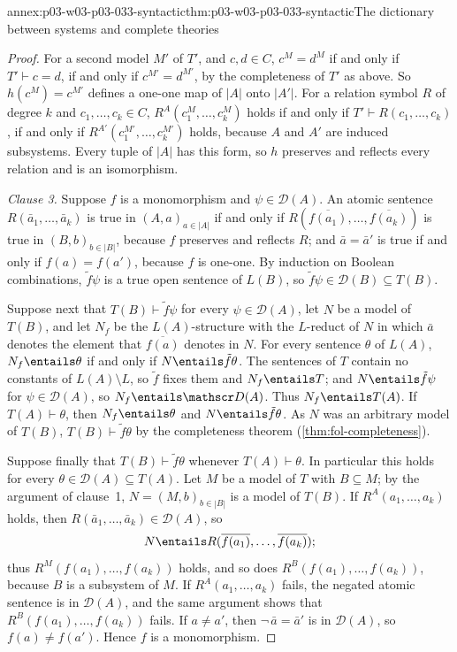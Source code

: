 \begin{annexitem}{annex:p03-w03-p03-033-syntactic}{thm:p03-w03-p03-033-syntactic}{The dictionary between systems and complete theories}
\begin{proof}
For a second model \(M'\) of \(T'\), and \(c,d\in C\),
\(c^M=d^M\) if and only if \(T'\vdash c=d\), if and only if
\(c^{M'}=d^{M'}\), by the completeness of \(T'\) as above. So
\(h(c^M)=c^{M'}\) defines a one-one map of \(|A|\) onto \(|A'|\). For a
relation symbol \(R\) of degree \(k\) and \(c_1,\dots,c_k\in C\),
\(R^A(c_1^M,\dots,c_k^M)\) holds if and only if
\(T'\vdash R(c_1,\dots,c_k)\), if and only if
\(R^{A'}(c_1^{M'},\dots,c_k^{M'})\) holds, because \(A\) and \(A'\) are
induced subsystems. Every tuple of \(|A|\) has this form, so \(h\)
preserves and reflects every relation and is an isomorphism.

\emph{Clause 3.} Suppose \(f\) is a monomorphism and
\(\psi\in\mathscr D(A)\). An atomic sentence \(R(\bar a_1,\dots,\bar a_k)\)
is true in \((A,a)_{a\in|A|}\) if and only if
\(R(\overline{f(a_1)},\dots,\overline{f(a_k)})\) is true in
\((B,b)_{b\in|B|}\), because \(f\) preserves and reflects \(R\); and
\(\bar a=\bar a'\) is true if and only if \(f(a)=f(a')\), because \(f\)
is one-one. By induction on Boolean combinations, \(\tilde f\psi\) is a
true open sentence of \(L(B)\), so \(\tilde f\psi\in\mathscr D(B)\subseteq
T(B)\).

Suppose next that \(T(B)\vdash\tilde f\psi\) for every
\(\psi\in\mathscr D(A)\), let \(N\) be a model of \(T(B)\), and let
\(N_f\) be the \(L(A)\)-structure with the \(L\)-reduct of \(N\) in which
\(\bar a\) denotes the element that \(\overline{f(a)}\) denotes in \(N\).
For every sentence \(\theta\) of \(L(A)\), \(N_f\entails\theta\) if and
only if \(N\entails\tilde f\theta\). The sentences of \(T\) contain no
constants of \(L(A)\setminus L\), so \(\tilde f\) fixes them and
\(N_f\entails T\); and \(N\entails\tilde f\psi\) for
\(\psi\in\mathscr D(A)\), so \(N_f\entails\mathscr D(A)\). Thus
\(N_f\entails T(A)\). If \(T(A)\vdash\theta\), then \(N_f\entails\theta\)
and \(N\entails\tilde f\theta\). As \(N\) was an arbitrary model of
\(T(B)\), \(T(B)\vdash\tilde f\theta\) by the completeness theorem
(\cref{thm:fol-completeness}).

Suppose finally that \(T(B)\vdash\tilde f\theta\) whenever
\(T(A)\vdash\theta\). In particular this holds for every
\(\theta\in\mathscr D(A)\subseteq T(A)\). Let \(M\) be a model of \(T\)
with \(B\subseteq M\); by the argument of clause~1,
\(N=(M,b)_{b\in|B|}\) is a model of \(T(B)\). If \(R^A(a_1,\dots,a_k)\)
holds, then \(R(\bar a_1,\dots,\bar a_k)\in\mathscr D(A)\), so
\[
 N\entails R(\overline{f(a_1)},\dots,\overline{f(a_k)});
\]
thus
\(R^M(f(a_1),\dots,f(a_k))\) holds, and so does
\(R^B(f(a_1),\dots,f(a_k))\), because \(B\) is a subsystem of \(M\). If
\(R^A(a_1,\dots,a_k)\) fails, the negated atomic sentence is in
\(\mathscr D(A)\), and the same argument shows that
\(R^B(f(a_1),\dots,f(a_k))\) fails. If \(a\neq a'\), then
\(\neg\,\bar a=\bar a'\) is in \(\mathscr D(A)\), so
\(f(a)\neq f(a')\). Hence \(f\) is a monomorphism.


\end{proof}
\end{annexitem}
